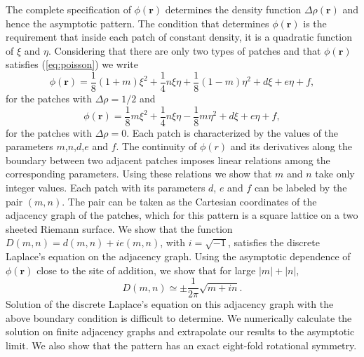 \documentclass[11pt,a4paper]{book}
\begin{document}
The complete specification of $\phi\left( \mathbf{r} \right)$
determines the density function $\Delta\rho\left( \mathbf{r} \right)$
and hence the asymptotic pattern. The condition
that determines $\phi\left( \mathbf{r} \right)$ is the requirement
that inside each patch of constant density, it is a quadratic function
of $\xi$ and $\eta$. Considering that there are only two types of
patches and that $\phi\left(
\mathbf{r}\right)$ satisfies (\ref{eq:poisson}) we write
\begin{equation}
\phi\left( \mathbf{r}
\right)=\frac{1}{8}\left( 1+m\right)\xi^{2}+\frac{1}{4}n\xi\eta+\frac{1}{8}\left( 1-m \right)\eta^{2}+d\xi+e\eta+f,
\end{equation}
for the patches with $\Delta\rho=1/2$ and
\begin{equation}
\phi\left( \mathbf{r}
\right)=\frac{1}{8}m\xi^{2}+\frac{1}{4}n\xi\eta-\frac{1}{8}m \eta^{2}+d\xi+e\eta+f,
\end{equation}
for the patches with $\Delta\rho=0$. Each patch is
characterized by the values of the parameters $m$,$n$,$d$,$e$ and $f$. The continuity of
$\phi\left( r \right)$ and its derivatives along the boundary between
two adjacent patches imposes linear relations among the corresponding
parameters. Using these relations we show that $m$ and $n$ take
only integer values. Each patch with its
parameters $d$, $e$ and $f$ can be labeled by
the pair $\left( m,n \right)$. The pair can be taken as the Cartesian coordinates of the
adjacency graph of the patches, which for this pattern is a square lattice on a two
sheeted Riemann surface. We show that the function $D\left(
m,n \right)=d\left( m,n \right)+ie\left( m,n \right)$, with
$i=\sqrt{-1}$,
satisfies the discrete Laplace's equation on the adjacency
graph. Using the asymptotic dependence of $\phi\left(
\mathbf{r} \right)$ close to the site of addition, we show that 
for large $|m|+|n|$,
\begin{equation}
D\left( m,n \right)\simeq\pm\frac{1}{2\pi}\sqrt{m+in}.
\end{equation}
Solution of the discrete Laplace's equation on this adjacency graph
with the above boundary condition is
difficult to determine. We numerically calculate the solution on
finite adjacency graphs and extrapolate our results to the asymptotic
limit. We also show that the pattern has an exact eight-fold rotational
symmetry.
\end{document}
